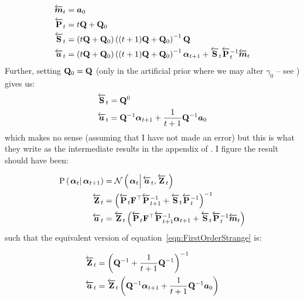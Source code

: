 \begin{equation}\begin{split}
	\vecLarrow{m}_t &= \vec{a}_0 \\
%
	\matLarrow{P}_t &= t\mat{Q} + \mat{Q}_0 \\
%
	\matLarrow{S}_t &= 
		\Lparen{t\mat{Q} + \mat{Q}_0}
		\Lparen{(t+1)\mat{Q} + \mat{Q}_0}^{-1}\mat{Q} \\
%
	\vecLarrow{a}_t &= 
		\Lparen{t\mat{Q} + \mat{Q}_0}
		\Lparen{(t+1)\mat{Q} + \mat{Q}_0}^{-1}\vec{\alpha}_{t+1} 
		+ \matLarrow{S}_t\matLarrow{P}_t^{-1} \vecLarrow{m}_t
\end{split}\end{equation}%
%
Further, setting $\mathbf{Q}_0 = \mathbf{Q}$ (only in the artificial prior where we may alter $\gamma_0$ -- see \citet[page 70]{briers10}) gives us:
%
\begin{equation}\begin{split}\label{eqn:FirstOrderStrange}
	\matLarrow{S}_t &= 
		\mat{Q}^0 \\
%
	\vecLarrow{a}_t &= 
		\mat{Q}^{-1}\vec{\alpha}_{t+1}
		+ \frac{1}{t + 1}\mat{Q}^{-1}  \vec{a}_0
\end{split}\end{equation}
%
%
which makes no sense (assuming that I have not made an error) but this is what they write as the intermediate results in the appendix of \cite{fearnhead10}. I figure the result should have been:

\begin{equation}\begin{split}\label{eqn:bwTransProp}
	\propC{\vec{\alpha}_t}{\vec{\alpha}_{t+1}} &= 
	\normalC{\vec{\alpha}_t}{\vecLarrow{a}_t}{\matLarrow{Z}_t} \\ 
%
	\matLarrow{Z}_t &= 
		\Lparen{
			\matLarrow{P}_t\mat{F}^\top\matLarrow{P}_{t + 1}^{-1}
			+ \matLarrow{S}_t\matLarrow{P}_t^{-1}
		}^{-1} \\
%
	\vecLarrow{a}_t &= 
		\matLarrow{Z}_t\Lparen{
			\matLarrow{P}_t\mat{F}^\top\matLarrow{P}_{t + 1}^{-1}\vec{\alpha}_{t+1}
			+ \matLarrow{S}_t\matLarrow{P}_t^{-1} \vecLarrow{m}_t
		}
\end{split}\end{equation}
%
%
such that the equivalent version of equation~\eqref{eqn:FirstOrderStrange} is:

\begin{equation}\begin{split}
	\matLarrow{Z}_t &= 
		\Lparen{\mat{Q}^{-1} + \frac{1}{t + 1}\mat{Q}^{-1}}^{-1} \\
%
	\vecLarrow{a}_t &= 
		\matLarrow{Z}_t\Lparen{
			\mat{Q}^{-1}\vec{\alpha}_{t+1}
			+ \frac{1}{t + 1}\mat{Q}^{-1}  \vec{a}_0
		}
\end{split}\end{equation}



